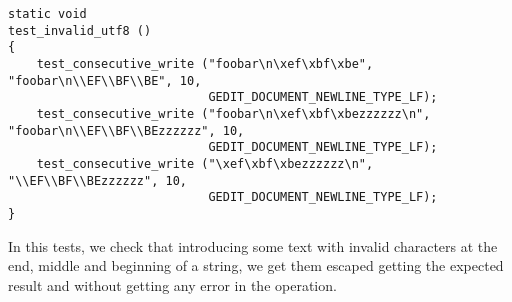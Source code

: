 \begin{lstlisting}[style=GObject]
static void
test_invalid_utf8 ()
{
	test_consecutive_write ("foobar\n\xef\xbf\xbe", "foobar\n\\EF\\BF\\BE", 10,
	                        GEDIT_DOCUMENT_NEWLINE_TYPE_LF);
	test_consecutive_write ("foobar\n\xef\xbf\xbezzzzzz\n", "foobar\n\\EF\\BF\\BEzzzzzz", 10,
	                        GEDIT_DOCUMENT_NEWLINE_TYPE_LF);
	test_consecutive_write ("\xef\xbf\xbezzzzzz\n", "\\EF\\BF\\BEzzzzzz", 10,
	                        GEDIT_DOCUMENT_NEWLINE_TYPE_LF);
}
\end{lstlisting}

In this tests, we check that introducing some text with invalid characters at the end, middle and beginning of a string, we get them escaped getting the expected result and without getting any error in the operation.
